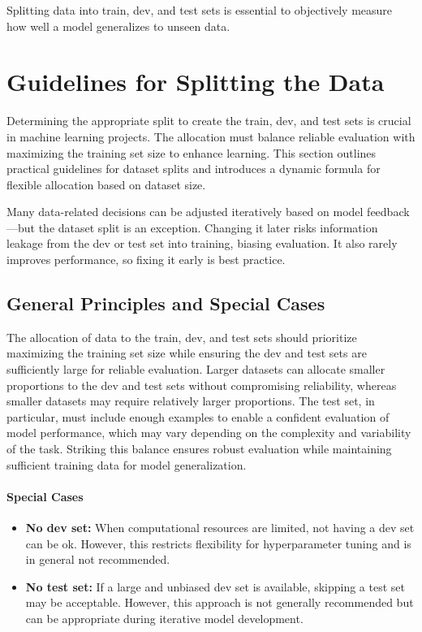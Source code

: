 \documentclass[12pt,openany]{book}
\begin{document}
Splitting data into train, dev, and test sets is essential to objectively measure how well a model generalizes to unseen data.



\section{Guidelines for Splitting the Data}

Determining the appropriate split to create the train, dev, and test sets is crucial in machine learning projects. The allocation must balance reliable evaluation with maximizing the training set size to enhance learning. This section outlines practical guidelines for dataset splits and introduces a dynamic formula for flexible allocation based on dataset size.

\begin{notebox}
Many data-related decisions can be adjusted iteratively based on model feedback—but the dataset split is an exception. Changing it later risks information leakage from the dev or test set into training, biasing evaluation. It also rarely improves performance, so fixing it early is best practice.
\end{notebox}


\subsection{General Principles and Special Cases}

The allocation of data to the train, dev, and test sets should prioritize maximizing the training set size while ensuring the dev and test sets are sufficiently large for reliable evaluation. Larger datasets can allocate smaller proportions to the dev and test sets without compromising reliability, whereas smaller datasets may require relatively larger proportions. The test set, in particular, must include enough examples to enable a confident evaluation of model performance, which may vary depending on the complexity and variability of the task. Striking this balance ensures robust evaluation while maintaining sufficient training data for model generalization.

\paragraph{Special Cases}
\begin{itemize}
    \item \textbf{No dev set:} When computational resources are limited, not having a dev set can be ok. However, this restricts flexibility for hyperparameter tuning and is in general not recommended.
    \item \textbf{No test set:} If a large and unbiased dev set is available, skipping a test set may be acceptable. However, this approach is not generally recommended but can be appropriate during iterative model development.
\end{itemize}
\end{document}
